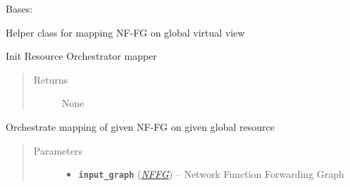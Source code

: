 \documentclass[letterpaper,10pt,english]{sphinxmanual}
\begin{document}
\begin{fulllineitems}
\label{orchest/ros_mapping:escape.orchest.ros_mapping.ResourceOrchestrationMapper}
Bases: {\hyperref[util/mapping:escape.util.mapping.AbstractMapper]{\emph{}}}

Helper class for mapping NF-FG on global virtual view

\begin{fulllineitems}
\label{orchest/ros_mapping:escape.orchest.ros_mapping.ResourceOrchestrationMapper._eventMixin_events}
\end{fulllineitems}


\begin{fulllineitems}
\label{orchest/ros_mapping:escape.orchest.ros_mapping.ResourceOrchestrationMapper.__init__}
Init Resource Orchestrator mapper
\begin{quote}\begin{description}
\item[{Returns}] \leavevmode
None

\end{description}\end{quote}

\end{fulllineitems}


\begin{fulllineitems}
\label{orchest/ros_mapping:escape.orchest.ros_mapping.ResourceOrchestrationMapper.orchestrate}
Orchestrate mapping of given NF-FG on given global resource
\begin{quote}\begin{description}
\item[{Parameters}] \leavevmode\begin{itemize}
\item {} 
\textbf{\texttt{input\_graph}} ({\hyperref[util/nffg:escape.util.nffg.NFFG]{\emph{\emph{NFFG}}}}) -- Network Function Forwarding Graph


\end{itemize}
\end{description}
\end{quote}
\end{fulllineitems}
\end{fulllineitems}
\end{document}
